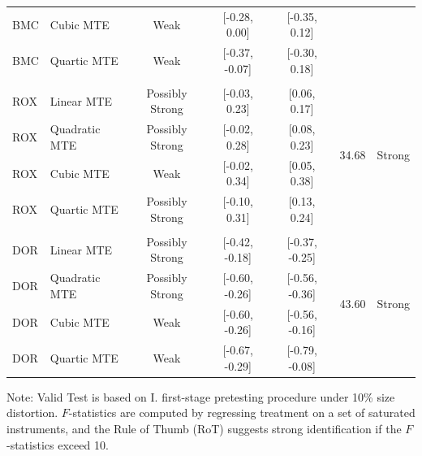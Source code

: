 \documentclass[11pt]{article}
\theoremstyle{definition}
\newcommand{\0}{\ensuremath{\mathbf{0}}}
\begin{document}
\begin{bibunit}
\begin{table}[htbp]
\begin{threeparttable}
\begin{tabular}{llccccc}
    BMC   & Cubic MTE & Weak  & [-0.28, 0.00] & [-0.35, 0.12] &       &  \\
    BMC   & Quartic MTE & Weak  & [-0.37, -0.07] & [-0.30, 0.18] &       &  \\
          &       &       &       &       &       &  \\
    ROX   & Linear MTE & Possibly Strong & [-0.03, 0.23] & [0.06, 0.17] & \multirow{4}[0]{*}{34.68} & \multirow{4}[0]{*}{Strong} \\
    ROX   & Quadratic MTE & Possibly Strong & [-0.02, 0.28] & [0.08, 0.23] &       &  \\
    ROX   & Cubic MTE & Weak  & [-0.02, 0.34] & [0.05, 0.38] &       &  \\
    ROX   & Quartic MTE & Possibly Strong & [-0.10, 0.31] & [0.13, 0.24] &       &  \\
          &       &       &       &       &       &  \\
    DOR   & Linear MTE & Possibly Strong & [-0.42, -0.18] & [-0.37, -0.25] & \multirow{4}[1]{*}{43.60} & \multirow{4}[1]{*}{Strong} \\
    DOR   & Quadratic MTE & Possibly Strong & [-0.60, -0.26] & [-0.56, -0.36] &       &  \\
    DOR   & Cubic MTE & Weak  & [-0.60, -0.26] & [-0.56, -0.16] &       &  \\
    DOR   & Quartic MTE & Weak  & [-0.67, -0.29] & [-0.79, -0.08] &       &  \\
    \bottomrule
    \end{tabular}%
    \begin{tablenotes}
    \footnotesize Note: Valid Test is based on I.\cite{andrews.i:2018} first-stage pretesting procedure under 10\% size distortion. $F$-statistics are computed by regressing treatment on a set of saturated instruments, and the Rule of Thumb (RoT) suggests strong identification if the $F$-statistics exceed 10.
    \end{tablenotes}
    \end{threeparttable}
  \label{tab:IVstrength_AMPRTE}%
\end{table}%



\end{bibunit}
\end{document}
